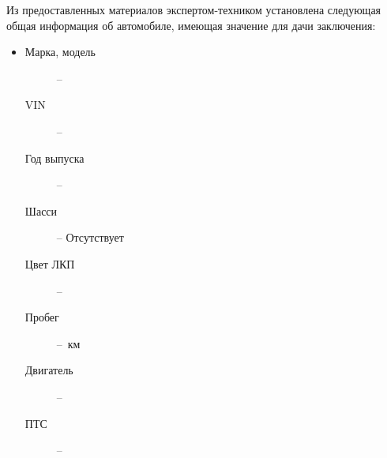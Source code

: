  \par Из предоставленных материалов   экспертом-техником установлена следующая общая информация об автомобиле, имеющая значение для дачи заключения:\\
 \parbox[]{10cm}{}
	\begin{itemize}
		\item[ ] 
			\begin{description}
			\item[Марка, модель] -- 
			\item[VIN] -- \vin
			\item[Год выпуска] -- 
			\item[Шасси] -- Отсутствует
			\item[Цвет ЛКП] -- 
			\item[Пробег] --  \,км%
			\item[Двигатель] -- 
	    	\item[ПТС] --	
		\end{description}
		\end{itemize}
%    
%    
%    
